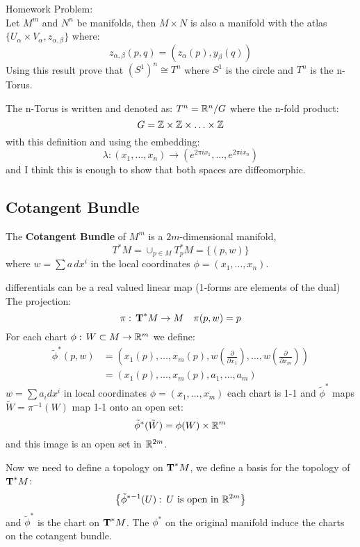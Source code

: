 Homework Problem:\\
Let $M^m$ and $N^n$ be manifolds, then $M\times N$ is also a manifold with the atlas $\{ U_\alpha \times V_\alpha, z_{\alpha,\beta} \}$ where:
$$ z_{\alpha,\beta}(p,q) = (z_\alpha(p),y_\beta(q))$$
Using this result prove that $(S^1)^n \cong T^n$ where $S^1$ is the circle and $T^n$ is the n-Torus.

\begin{ddef}
The n-Torus is written and denoted as: $T^n = \mathbb{R}^n/G$ where the n-fold product:
$$G = \mathbb{Z} \times \mathbb{Z} \times \ldots \times \mathbb{Z}$$   
with this definition and using the embedding:
$$\lambda: (x_1,\ldots, x_n) \to (e^{2\pi i x_1},\ldots, e^{2\pi i x_n})$$
and I think this is enough to show that both spaces are diffeomorphic.
\end{ddef}

\subsection{Cotangent Bundle}
\begin{ddef}
The \textbf{Cotangent Bundle} of $M^m$ is a $2m$-dimensional manifold,
$$T^*M= \cup_{p\in M} T^*_p M = \{(p,w)\} $$
where $w=\sum a\, dx^i$ in the local coordinates $\phi=(x_1,\ldots, x_n)$.
\end{ddef}

differentials can be a real valued linear map (1-forms are elements of the dual) \\
The projection:
$$\pi:\, \text{\textbf{T}}^* M\to M \quad \pi(p,w) = p$$
For each chart $\phi:\, W\subset M \to \mathbb{R}^m$ we define:
\begin{align*}
\tilde \phi^*(p,w) &= (x_1(p),\ldots,x_m(p),w(\frac{\partial}{\partial x_1}) ,\ldots, w(\frac{\partial}{\partial x_m} ))\\
                &=      (x_1(p),\ldots,x_m(p),a_1,\ldots,a_m) 
\end{align*}
$w=\sum a_i dx^i$ in local coordinates $\phi=(x_1,\ldots, x_m)$  each chart is 1-1 and $\tilde \phi^*$ maps $\tilde W = \pi^{-1}(W)$ map 1-1 onto an open set:
$$\tilde \phi^*(\tilde W) = \phi(W)\times \mathbb{R}^m$$
and this image is an open set in $\mathbb{R}^{2m}$.

Now we need to define a topology on $\text{\textbf{T}}^* M$, we define a basis for the topology of $\text{\textbf{T}}^*M$:
$$\left\{ \tilde \phi^{*-1}(U):\, U \text{ is open in } \mathbb{R}^{2m} \right\}$$
and $\tilde \phi^*$ is the chart on $\text{\textbf{T}}^* M$. The $\phi^*$ on the original manifold induce the charts on the cotangent bundle.

